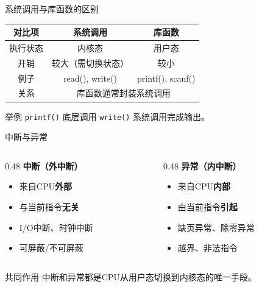 \documentclass[10pt, aspectratio=169]{beamer}
\begin{document}
\begin{frame}{系统调用与库函数的区别}
    \begin{tabular}{|c|c|c|}
        \hline
        对比项 & 系统调用 & 库函数 \\
        \hline
        执行状态 & 内核态 & 用户态 \\
        开销 & 较大（需切换状态） & 较小 \\
        例子 & read(), write() & printf(), scanf() \\
        关系 & \multicolumn{2}{c|}{库函数通常封装系统调用} \\
        \hline
    \end{tabular}
    \vspace{0.5em}
    \begin{exampleblock}{举例}
        \texttt{printf()} 底层调用 \texttt{write()} 系统调用完成输出。
    \end{exampleblock}
\end{frame}

\begin{frame}{中断与异常}
    \begin{columns}
        \begin{column}{0.48\textwidth}
            \textbf{中断（外中断）}
            \begin{itemize}
                \item 来自CPU\textbf{外部}
                \item 与当前指令\textbf{无关}
                \item I/O中断、时钟中断
                \item 可屏蔽/不可屏蔽
            \end{itemize}
        \end{column}
        \begin{column}{0.48\textwidth}
            \textbf{异常（内中断）}
            \begin{itemize}
                \item 来自CPU\textbf{内部}
                \item 由当前指令\textbf{引起}
                \item 缺页异常、除零异常
                \item 越界、非法指令
            \end{itemize}
        \end{column}
    \end{columns}
    \vspace{0.5em}
    \begin{block}{共同作用}
        中断和异常都是CPU从用户态切换到内核态的唯一手段。
    \end{block}
\end{frame}
\end{document}
